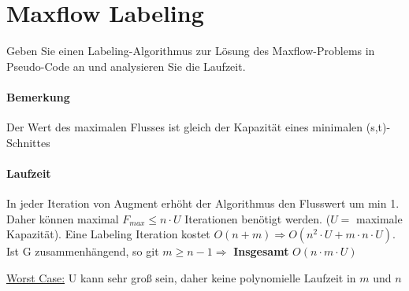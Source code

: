 \newpage

\section{Maxflow Labeling}
\label{sec-3}
Geben Sie einen Labeling-Algorithmus zur Lösung des Maxflow-Problems in Pseudo-Code an und analysieren Sie die Laufzeit.

\paragraph{Bemerkung} Der Wert des maximalen Flusses ist gleich der Kapazität eines minimalen (s,t)-Schnittes

\paragraph{Laufzeit} In jeder Iteration von Augment erhöht der Algorithmus den Flusswert um min 1. Daher können maximal $F_{max} \leq n\cdot U$ Iterationen benötigt werden. ($U =$ maximale Kapazität). Eine Labeling Iteration kostet $O(n+m) \Rightarrow O(n^2 \cdot U + m \cdot n \cdot U)$.\\
Ist G zusammenhängend, so git $m \geq n -1 \Rightarrow$ \textbf{Insgesamt} $O(n\cdot m \cdot U)$

\underline{Worst Case:} U kann sehr groß sein, daher keine polynomielle Laufzeit in $m$ und $n$

